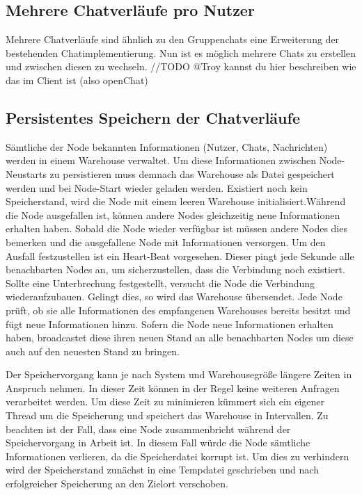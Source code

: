 \author{Matthias Vonend, Troy Keßler}
\subsection{Mehrere Chatverläufe pro Nutzer}
Mehrere Chatverläufe sind ähnlich zu den Gruppenchats eine Erweiterung der bestehenden Chatimplementierung. Nun ist es möglich mehrere Chats zu erstellen und zwischen diesen zu wechseln.
//TODO @Troy kannst du hier beschreiben wie das im Client ist (also openChat)

\author{Matthias Vonend}
\subsection{Persistentes Speichern der Chatverläufe}\label{persistance}
Sämtliche der Node bekannten Informationen (Nutzer, Chats, Nachrichten) werden in einem Warehouse verwaltet. Um diese Informationen zwischen Node-Neustarts zu persistieren muss demnach das Warehouse als Datei gespeichert werden und bei Node-Start wieder geladen werden. Existiert noch kein Speicherstand, wird die Node mit einem leeren Warehouse initialisiert.Während die Node ausgefallen ist, können andere Nodes gleichzeitig neue Informationen erhalten haben. Sobald die Node wieder verfügbar ist müssen andere Nodes dies bemerken und die ausgefallene Node mit Informationen versorgen. Um den Ausfall festzustellen ist ein Heart-Beat vorgesehen. Dieser pingt jede Sekunde alle benachbarten Nodes an, um sicherzustellen, dass die Verbindung noch existiert. Sollte eine Unterbrechung festgestellt, versucht die Node die Verbindung wiederaufzubauen. Gelingt dies, so wird das Warehouse übersendet. Jede Node prüft, ob sie alle Informationen des empfangenen Warehouses bereits besitzt und fügt neue Informationen hinzu. Sofern die Node neue Informationen erhalten haben, broadcastet diese ihren neuen Stand an alle benachbarten Nodes um diese auch auf den neuesten Stand zu bringen.

Der Speichervorgang kann je nach System und Warehousegröße längere Zeiten in Anspruch nehmen. In dieser Zeit können in der Regel keine weiteren Anfragen verarbeitet werden. Um diese Zeit zu minimieren kümmert sich ein eigener Thread um die Speicherung und speichert das Warehouse in Intervallen.
Zu beachten ist der Fall, dass eine Node zusammenbricht während der Speichervorgang in Arbeit ist. In diesem Fall würde die Node sämtliche Informationen verlieren, da die Speicherdatei korrupt ist. Um dies zu verhindern wird der Speicherstand zunächst in eine Tempdatei geschrieben und nach erfolgreicher Speicherung an den Zielort verschoben.


